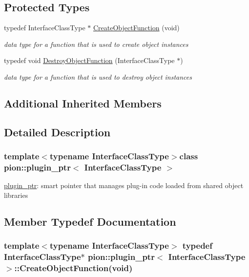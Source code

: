 \subsection*{Protected Types}
\begin{DoxyCompactItemize}
\item 
typedef Interface\-Class\-Type $\ast$ \hyperlink{classpion_1_1plugin__ptr_a1082ceb3823f7f881cce49be1ebedb59}{Create\-Object\-Function} (void)
\begin{DoxyCompactList}\small\item\em data type for a function that is used to create object instances \end{DoxyCompactList}\item 
typedef void \hyperlink{classpion_1_1plugin__ptr_a38007852c54314c3c33bdb865cce7c8e}{Destroy\-Object\-Function} (Interface\-Class\-Type $\ast$)
\begin{DoxyCompactList}\small\item\em data type for a function that is used to destroy object instances \end{DoxyCompactList}\end{DoxyCompactItemize}
\subsection*{Additional Inherited Members}


\subsection{Detailed Description}
\subsubsection*{template$<$typename Interface\-Class\-Type$>$class pion\-::plugin\-\_\-ptr$<$ Interface\-Class\-Type $>$}

\hyperlink{classpion_1_1plugin__ptr}{plugin\-\_\-ptr}\-: smart pointer that manages plug-\/in code loaded from shared object libraries 

\subsection{Member Typedef Documentation}
\hypertarget{classpion_1_1plugin__ptr_a1082ceb3823f7f881cce49be1ebedb59}{
\subsubsection[{Create\-Object\-Function}]{\setlength{\rightskip}{0pt plus 5cm}template$<$typename Interface\-Class\-Type$>$ typedef Interface\-Class\-Type$\ast$ {\bf pion\-::plugin\-\_\-ptr}$<$ Interface\-Class\-Type $>$\-::Create\-Object\-Function(void)\hspace{0.3cm}{\ttfamily [protected]}}}\label{classpion_1_1plugin__ptr_a1082ceb3823f7f881cce49be1ebedb59}


